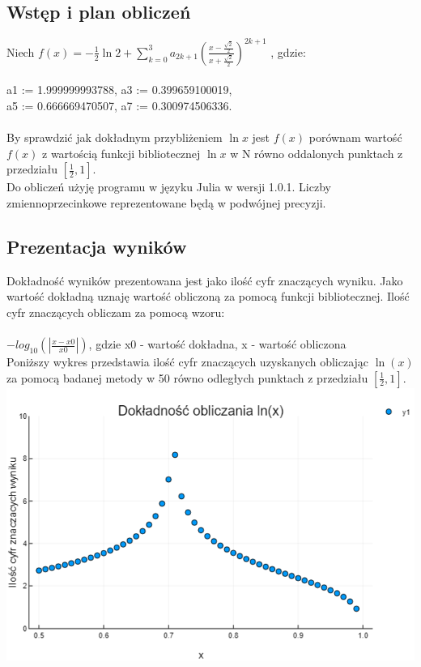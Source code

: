 \documentclass[10pt]{article}
\begin{document}
\subsection{Wstęp i plan obliczeń}
Niech 
\begin{math}
f(x) = -\frac{1}{2} \ln2 + \sum_{k=0}^{3} a_{2k+1} \left(\frac{x - \frac{\sqrt{2}}{2}}{x + \frac{\sqrt{2}}{2}} \right)^{2k+1}
\end{math} , gdzie: \\
\\
a1 := 1.999999993788, \hspace{1.5cm} a3 := 0.399659100019, \\
a5 := 0.666669470507, \hspace{1.5cm} a7 := 0.300974506336. \\
\\
By sprawdzić jak dokładnym przybliżeniem $\ln x$ jest $f(x)$ porównam wartość $f(x)$ z wartością funkcji bibliotecznej $\ln x$ w N równo oddalonych punktach z przedziału $[\frac{1}{2},1]$. \\
Do obliczeń użyję programu w języku Julia w wersji 1.0.1. Liczby zmiennoprzecinkowe reprezentowane będą w podwójnej precyzji. 

\subsection{Prezentacja wyników}
Dokładność wyników prezentowana jest jako ilość cyfr znaczących wyniku. Jako wartość dokładną uznaję wartość obliczoną za pomocą funkcji bibliotecznej. Ilość cyfr znaczących obliczam za pomocą wzoru: \\
\\
\begin{math}
-log_{10}(|\frac{x-x0}{x0}|)
\end{math}, gdzie x0 - wartość dokładna, x - wartość obliczona\\

Poniższy wykres przedstawia ilość cyfr znaczących uzyskanych obliczając $\ln(x)$ za pomocą badanej metody w 50 równo odległych punktach z przedziału $[\frac{1}{2},1]$.\\

\includegraphics[scale=0.60]{wykres1.png}
\end{document}
